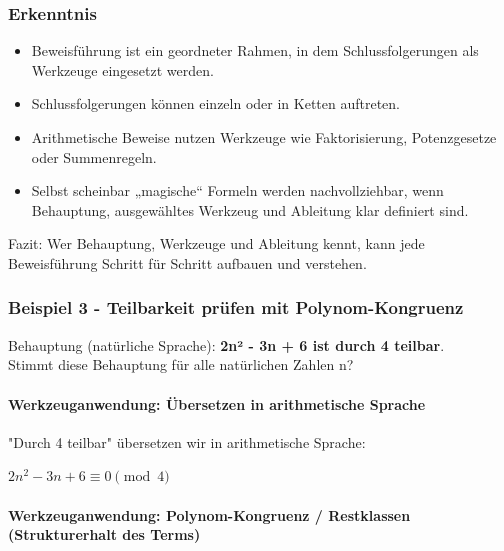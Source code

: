 \documentclass{article}
\begin{document}
      \subsubsection{Erkenntnis}
      \begin{itemize}
        \item Beweisführung ist ein geordneter Rahmen, in dem Schlussfolgerungen als Werkzeuge eingesetzt werden.

        \item Schlussfolgerungen können einzeln oder in Ketten auftreten.

        \item Arithmetische Beweise nutzen Werkzeuge wie Faktorisierung, Potenzgesetze oder Summenregeln.

        \item Selbst scheinbar „magische“ Formeln werden nachvollziehbar, wenn Behauptung, ausgewähltes Werkzeug und Ableitung klar definiert sind.

      \end{itemize}

      
Fazit: Wer Behauptung, Werkzeuge und Ableitung kennt, kann jede Beweisführung Schritt für Schritt aufbauen und verstehen.


      \subsubsection{Beispiel 3 - Teilbarkeit prüfen mit Polynom-Kongruenz}
      

        Behauptung (natürliche Sprache): \textbf{2n² - 3n + 6 ist durch 4 teilbar}.\\
        Stimmt diese Behauptung für alle natürlichen Zahlen n?
      


      \paragraph{Werkzeuganwendung: Übersetzen in arithmetische Sprache}
      

        "Durch 4 teilbar" übersetzen wir in arithmetische Sprache:
      

      
          $2n^2 - 3n + 6 \equiv 0 \pmod{4}$
      


      \paragraph{Werkzeuganwendung: Polynom-Kongruenz / Restklassen (Strukturerhalt des Terms)}
\end{document}
